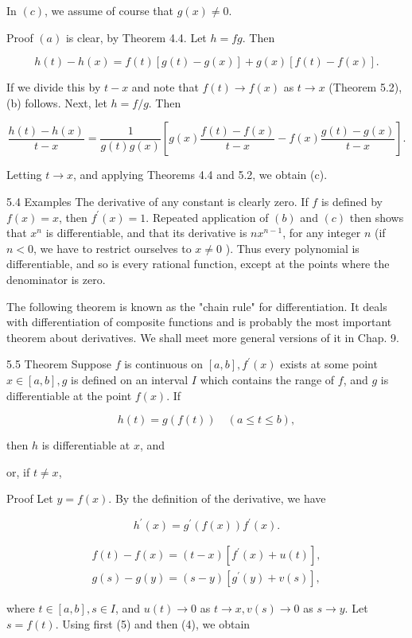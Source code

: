 \documentclass[10pt]{article}
\begin{document}
In $(c)$, we assume of course that $g(x) \neq 0$.

Proof $(a)$ is clear, by Theorem 4.4. Let $h=f g$. Then

$$
h(t)-h(x)=f(t)[g(t)-g(x)]+g(x)[f(t)-f(x)] .
$$

If we divide this by $t-x$ and note that $f(t) \rightarrow f(x)$ as $t \rightarrow x$ (Theorem 5.2), (b) follows. Next, let $h=f / g$. Then

$$
\frac{h(t)-h(x)}{t-x}=\frac{1}{g(t) g(x)}\left[g(x) \frac{f(t)-f(x)}{t-x}-f(x) \frac{g(t)-g(x)}{t-x}\right] .
$$

Letting $t \rightarrow x$, and applying Theorems 4.4 and 5.2, we obtain (c).

5.4 Examples The derivative of any constant is clearly zero. If $f$ is defined by $f(x)=x$, then $f^{\prime}(x)=1$. Repeated application of $(b)$ and $(c)$ then shows that $x^{n}$ is differentiable, and that its derivative is $n x^{n-1}$, for any integer $n$ (if $n<0$, we have to restrict ourselves to $x \neq 0$ ). Thus every polynomial is differentiable, and so is every rational function, except at the points where the denominator is zero.

The following theorem is known as the "chain rule" for differentiation. It deals with differentiation of composite functions and is probably the most important theorem about derivatives. We shall meet more general versions of it in Chap. 9.

5.5 Theorem Suppose $f$ is continuous on $[a, b], f^{\prime}(x)$ exists at some point $x \in[a, b], g$ is defined on an interval $I$ which contains the range of $f$, and $g$ is differentiable at the point $f(x)$. If

$$
h(t)=g(f(t)) \quad(a \leq t \leq b),
$$

then $h$ is differentiable at $x$, and

or, if $t \neq x$,

Proof Let $y=f(x)$. By the definition of the derivative, we have

$$
h^{\prime}(x)=g^{\prime}(f(x)) f^{\prime}(x) .
$$

$$
\begin{gathered}
f(t)-f(x)=(t-x)\left[f^{\prime}(x)+u(t)\right], \\
g(s)-g(y)=(s-y)\left[g^{\prime}(y)+v(s)\right],
\end{gathered}
$$

where $t \in[a, b], s \in I$, and $u(t) \rightarrow 0$ as $t \rightarrow x, v(s) \rightarrow 0$ as $s \rightarrow y$. Let $s=f(t)$. Using first (5) and then (4), we obtain
\end{document}
